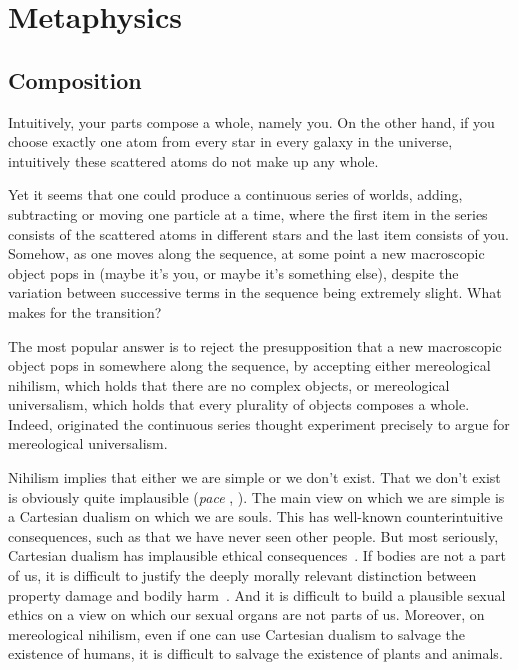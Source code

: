 \def\mychapter{IX}

\chapter{Metaphysics}\label{ch:metaphysics}
\section{Composition}\label{sec:comp}
Intuitively, your parts compose a whole, namely you. On the other hand,
if you choose exactly one atom from every star in every galaxy in the universe,
intuitively these scattered atoms do not make up any whole.

Yet it seems that one could produce a continuous series of worlds, adding, subtracting or moving 
one particle at a time, where the first item in the series consists of the scattered
atoms in different stars and the last item consists of you. Somehow, as one moves
along the sequence, at some point a new macroscopic object pops in (maybe it's 
you, or maybe it's something else), despite the variation between successive terms
in the sequence being extremely slight. What makes for the transition?

The most popular answer is to reject the presupposition that a new macroscopic object
pops in somewhere along the sequence, by accepting either mereological nihilism, which holds that
there are no complex objects, or mereological universalism, which holds that every plurality of
objects composes a whole. Indeed,  originated the continuous series 
thought experiment precisely to argue for mereological universalism. 

Nihilism implies that either we are
simple or we don't exist. That we don't exist is obviously quite implausible (\textit{pace} \citeauthor{UngerDoNotExist}, \citeyear{UngerDoNotExist}). 
The main view on which we are simple is a Cartesian dualism on which we are souls. This has
well-known counterintuitive consequences, such as that we have never seen other people. But
most seriously, Cartesian dualism has implausible ethical consequences~\parencite{LeeGeorge}. If bodies are not a
part of us, it is difficult to justify the deeply morally relevant distinction between property damage
and bodily harm~. And it is difficult to build a plausible sexual ethics on a view on which our sexual
organs are not parts of us. Moreover, on mereological nihilism, even if one can use Cartesian dualism to salvage
the existence of humans, it is difficult to salvage the existence of plants and animals.

